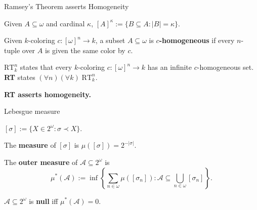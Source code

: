 \begin{frame}{Ramsey's Theorem asserts Homogeneity}
  \begin{notation*}
    Given $A\subseteq\omega$ and cardinal $\kappa$,
    $[A]^\kappa :=\{B\subseteq A:|B|=\kappa\}$.
  \end{notation*}

  \begin{define*}[$c$-homogeneous]
    Given $k$-coloring $c:[\omega]^n\rightarrow k$, a subset
    $A\subseteq\omega$ is \textbf{$c$-homogeneous} if every $n$-tuple over
    $A$ is given the same color by $c$.
  \end{define*}

  \begin{thm*}[Ramsey's]
    \textbf{$\text{RT}_k^n$} states that every $k$-coloring
    $c:[\omega]^n\rightarrow k$ has an infinite $c$-homogeneous set.
    \textbf{RT} states $(\forall n)(\forall k)\; \text{RT}_k^n$.
  \end{thm*}

  \vspace{0.5em}
  \textbf{RT asserts homogeneity.}
\end{frame}

\begin{frame}{Lebesgue measure}
  \begin{notation*}
    $[\sigma] :=\{X\in2^\omega: \sigma\prec X\}$.
  \end{notation*}

  \begin{define*}
    The \textbf{measure} of $[\sigma]$ is $\mu([\sigma]) =2^{-|\sigma|}$.
  \end{define*}

  \begin{define*}
    The \textbf{outer measure} of $\mathcal{A}\subseteq2^\omega$ is
    \[\mu^*(\mathcal{A}):= \inf\left\{\sum_{n\in\omega}
    \mu([\sigma_n]): \mathcal{A}\subseteq
    \bigcup_{n\in\omega} [\sigma_n]\right\}.\]
  \end{define*}

  \begin{define*}
    $\mathcal{A}\subseteq2^\omega$ is \textbf{null} iff
    $\mu^*(\mathcal{A})=0$.
  \end{define*}
\end{frame}

